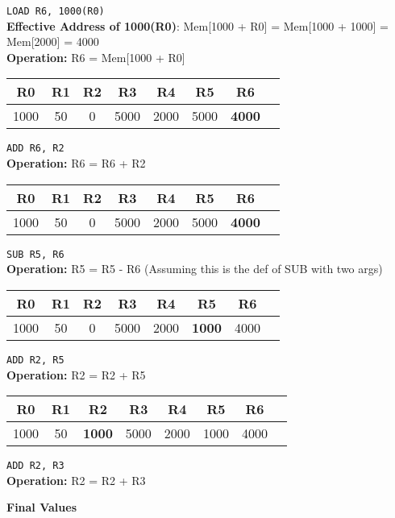 \documentclass[a4paper, 15pt]{exam}
\begin{document}
\begin{enumerate}
\verb|LOAD R6, 1000(R0)| \\
\textbf{Effective Address of 1000(R0)}: Mem[1000 + R0] = Mem[1000 + 1000] = Mem[2000] = 4000\\
\textbf{Operation:} R6 = Mem[1000 + R0]

\begin{center}
 	\begin{tabular}{ |c|c|c|c|c|c|c|c|} 
 		\hline
 		R0 & R1 & R2& R3 & R4 &R5&R6\\ 
 		\hline
 		1000 & 50 & 0 & 5000 & 2000 & 5000 & \textbf{4000}\\ 
 		\hline
 	\end{tabular}
 \end{center}

 \verb|ADD R6, R2| \\
 \textbf{Operation:} R6 = R6 + R2

\begin{center}
 	\begin{tabular}{ |c|c|c|c|c|c|c|c|} 
 		\hline
 		R0 & R1 & R2& R3 & R4 &R5&R6\\ 
 		\hline
 		1000 & 50 & 0 & 5000 & 2000 & 5000 & \textbf{4000}\\ 
 		\hline
 	\end{tabular}
 \end{center}
 
\verb|SUB R5, R6| \\
\textbf{Operation:} R5 = R5 - R6 (Assuming this is the def of SUB with two args)

\begin{center}
 	\begin{tabular}{ |c|c|c|c|c|c|c|c|} 
 		\hline
 		R0 & R1 & R2& R3 & R4 &R5&R6\\ 
 		\hline
 		1000 & 50 & 0 & 5000 & 2000 & \textbf{1000} & 4000\\ 
 		\hline
 	\end{tabular}
 \end{center}
 \verb|ADD R2, R5| \\
 \textbf{Operation:} R2 = R2 + R5
 
 \begin{center}
 	\begin{tabular}{ |c|c|c|c|c|c|c|c|} 
 		\hline
 		R0 & R1 & R2& R3 & R4 &R5&R6\\ 
 		\hline
 		1000 & 50 & \textbf{1000} & 5000 & 2000 & 1000 & 4000\\ 
 		\hline
 	\end{tabular}
 \end{center}
 \verb|ADD R2, R3| \\
 \textbf{Operation:} R2 = R2 + R3
 \begin{center}\textbf{Final Values}\end{center}
 

\end{enumerate}
\end{document}
